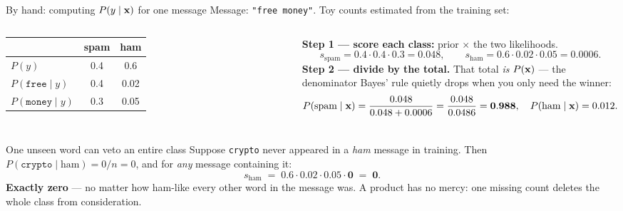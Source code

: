 \documentclass[aspectratio=169]{beamer}
\begin{document}
\begin{frame}{By hand: computing $P(y \mid \mathbf{x})$ for one message}
  Message: \texttt{"free money"}. Toy counts estimated from the training set:
  \vskip 2pt
  \begin{columns}[T]
    \footnotesize
    \renewcommand{\arraystretch}{1.2}
    \centering
    \begin{tabular}{l c c}
       & \textbf{spam} & \textbf{ham} \\
      \hline
      $P(y)$ & 0.4 & 0.6 \\
      $P(\texttt{free}\mid y)$ & 0.4 & 0.02 \\
      $P(\texttt{money}\mid y)$ & 0.3 & 0.05 \\
      \hline
    \end{tabular}
    \footnotesize
    \textbf{Step 1 --- score each class:} prior $\times$ the two likelihoods.
    \[
      s_{\text{spam}} = 0.4\cdot0.4\cdot0.3 = 0.048,
      \qquad
      s_{\text{ham}} = 0.6\cdot0.02\cdot0.05 = 0.0006.
    \]
    \textbf{Step 2 --- divide by the total.} That total \emph{is} $P(\mathbf{x})$ --- the denominator
    Bayes' rule quietly drops when you only need the winner:
    \[
      P(\text{spam}\mid\mathbf{x}) = \frac{0.048}{0.048 + 0.0006}
        = \frac{0.048}{0.0486} = \mathbf{0.988},
      \quad P(\text{ham}\mid\mathbf{x}) = 0.012.
    \]
  \end{columns}
  \vskip 2pt
\end{frame}

\begin{frame}{One unseen word can veto an entire class}
  Suppose \texttt{crypto} never appeared in a \emph{ham} message in training. Then
  $P(\texttt{crypto}\mid\text{ham}) = 0/n = 0$, and for \emph{any} message containing it:
  \[
    s_{\text{ham}} \;=\; 0.6 \cdot 0.02 \cdot 0.05 \cdot \mathbf{0} \;=\; \mathbf{0}.
  \]
  \textbf{Exactly zero} --- no matter how ham-like every other word in the message was. A product
  has no mercy: one missing count deletes the whole class from consideration.
  \vfill
\end{frame}
\end{document}
